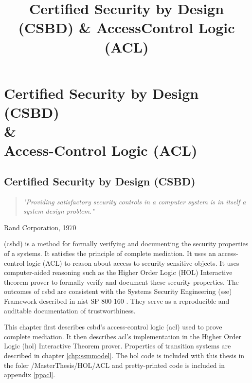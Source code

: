 \documentclass[../../main/main.tex]{subfiles}
\begin{document}
\title{Certified Security by Design (CSBD) \& Access\-Control Logic (ACL)}

\chapter[Certified Security by Design (CSBD) \& Access-Control Logic (ACL)]{Certified Security by Design (CSBD)  \\ \& \\ Access-Control Logic (ACL)} \label{chp:csbdacl}


\section{Certified Security by Design (CSBD)} \label{sec:csbd}

\begin{quote}
\textit{
"Providing satisfactory security controls in a computer system is in itself a system design problem."}  
\end{quote}

\begin{flushright}
Rand Corporation, 1970 \cite{defensescienceboard}
\end{flushright}

 (\gls{csbd}) is a method for formally verifying and documenting the security properties of a systems.  It satisfies the principle of complete mediation.  It uses an access-control logic (ACL) to reason about access to security sensitive objects.  It uses computer-aided reasoning such as the Higher Order Logic (HOL) Interactive theorem prover to formally verify and document these security properties.  The outcomes of \gls{csbd} are consistent with the Systems Security Engineering (\gls{sse}) Framework described in \gls{nist} SP 800-160 \cite{NIST800160}.  They serve as a reproducible and auditable documentation of trustworthiness.

This chapter first describes \gls{csbd}'s access-control logic (\gls{acl}) used to prove complete mediation.  It then describes \gls{acl}'s implementation in the Higher Order Logic (\gls{hol}) Interactive Theorem prover.  Properties of transition systems are described in chapter \ref{chp:ssmmodel}.  The \gls{hol} code is included with this thesis in the foler /MasterThesis/HOL/ACL and pretty-printed code is included in appendix \ref{ppacl}.

\end{document}
